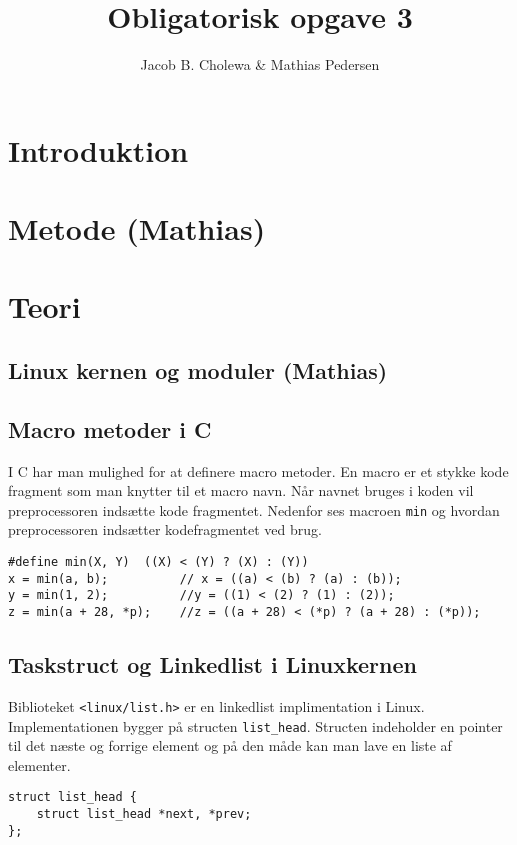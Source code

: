 \documentclass[danish]{report}
\title{Obligatorisk opgave 3}
\author{Jacob B. Cholewa \& Mathias Pedersen }
\begin{document}
\maketitle

\chapter{Introduktion}
\chapter{Metode (Mathias)}
\chapter{Teori}
\section{Linux kernen og moduler (Mathias)}


\section{Macro metoder i C}

I C har man mulighed for at definere macro metoder. En macro er et stykke kode fragment som man knytter til et macro navn. Når navnet bruges i koden vil preprocessoren indsætte kode fragmentet. Nedenfor ses macroen \texttt{min} og hvordan preprocessoren indsætter kodefragmentet ved brug.
\begin{lstlisting}
#define min(X, Y)  ((X) < (Y) ? (X) : (Y))
x = min(a, b);          // x = ((a) < (b) ? (a) : (b));
y = min(1, 2);          //y = ((1) < (2) ? (1) : (2));
z = min(a + 28, *p);    //z = ((a + 28) < (*p) ? (a + 28) : (*p));
\end{lstlisting}

\section{Taskstruct og Linkedlist i Linuxkernen}

Biblioteket \texttt{<linux/list.h>} er en linkedlist implimentation i Linux. Implementationen bygger på structen \texttt{list\_head}. Structen indeholder en pointer til det næste og forrige element og på den måde kan man lave en liste af elementer.

\begin{lstlisting}
struct list_head {
    struct list_head *next, *prev;
};
\end{lstlisting}
\end{document}
